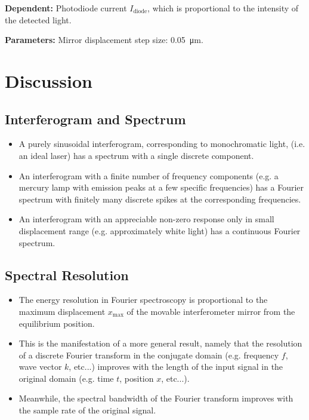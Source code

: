 \documentclass[11pt, a4paper]{article}
\begin{document}
\vspace{2mm}
\textbf{Dependent:} Photodiode current $ I_{\text{diode}} $, which is proportional to the intensity of the detected light.

\vspace{2mm}
\textbf{Parameters:} Mirror displacement step size: \SI{0.05}{\micro \meter}. 

\section{Discussion}

\subsection{Interferogram and Spectrum}
\begin{itemize}
	\item A purely sinusoidal interferogram, corresponding to monochromatic light, (i.e. an ideal laser) has a spectrum with a single discrete component.
	
	\item An interferogram with a finite number of frequency components (e.g. a mercury lamp with emission peaks at a few specific frequencies) has a Fourier spectrum with finitely many discrete spikes at the corresponding frequencies. 
	
	\item An interferogram with an appreciable non-zero response only in small displacement range (e.g. approximately white light) has a continuous Fourier spectrum.
\end{itemize}


\subsection{Spectral Resolution}
\begin{itemize}
	\item The energy resolution in Fourier spectroscopy is proportional to the maximum displacement $ x_{\text{max}} $ of the movable interferometer mirror from the equilibrium position. 
	
	
	\item This is the manifestation of a more general result, namely that the resolution of a discrete Fourier transform in the conjugate domain (e.g. frequency $ f $, wave vector $ k $, etc...) improves with the length of the input signal in the original domain (e.g. time $ t $, position $ x $, etc...). 
	
	\item Meanwhile, the spectral bandwidth of the Fourier transform improves with the sample rate of the original signal.
	
\end{itemize}
\end{document}
